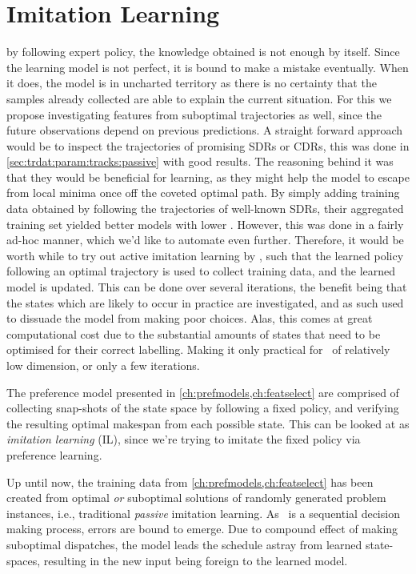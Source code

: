\chapter{Imitation Learning}\label{ch:imitation}

 by following 
expert policy, the knowledge obtained is not enough by itself. Since the 
learning model is not perfect, it is bound to make a mistake eventually. 
When it does, the model is in uncharted territory as there is no certainty that
the samples already collected are able to explain the current situation. 
For this we propose investigating features from suboptimal trajectories as 
well, since the future observations depend on previous predictions. 
A straight forward approach would be to inspect the trajectories of promising 
SDRs or CDRs, this was done in \cref{sec:trdat:param:tracks:passive} with good 
results. 
The reasoning behind it was that they would be beneficial for learning, 
as they might help the model to escape from local minima once off the coveted 
optimal path. 
By simply adding training data obtained by following the trajectories of 
well-known SDRs, their aggregated training set yielded better models with lower 
\namerho.
However, this was done in a fairly ad-hoc manner, which we'd like to automate 
even further.  
Therefore, it would be worth while to try out active imitation learning by 
\cite{RossB10,RossGB11}, such that the learned policy following an optimal 
trajectory is used to collect training data, and the learned model is updated. 
This can be done over several iterations, the benefit being that the 
states which are likely to occur in practice are investigated, and as such used 
to dissuade the model from making poor choices. 
Alas, this comes at great computational cost due to the substantial amounts of 
states that need to be optimised for their correct labelling. 
Making it only practical for \jsp\ of relatively low dimension, or only a few 
iterations. 

The preference model presented in \cref{ch:prefmodels,ch:featselect} are 
comprised of collecting snap-shots of the state space by following a fixed
policy, and verifying the resulting optimal makespan from each possible state. 
This can be looked at as \emph{imitation learning} (IL), since we're trying to 
imitate the fixed policy via preference learning.

Up until now, the training data from \cref{ch:prefmodels,ch:featselect} has 
been created from optimal \emph{or} suboptimal solutions of randomly generated 
problem instances, i.e., traditional \emph{passive} imitation learning. 
As \JSP\ is a sequential decision making process, errors are bound to emerge.  
Due to compound effect of making suboptimal dispatches, the model leads the 
schedule astray from learned state-spaces, resulting in the new input being 
foreign to the learned model. 

